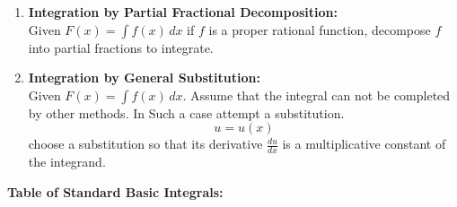 \documentclass[14pt]{article}
\begin{document}
\begin{enumerate}
\begin{center}
        \end{center}
        \item \textbf{Integration by Partial Fractional
        Decomposition:}\\
        Given $F(x)=\int f(x) \,dx$ if $f$ is a proper rational
        function, decompose $f$ into partial fractions to integrate.
        \item \textbf{Integration by General Substitution:}\\
        Given $F(x)=\int f(x) \, dx$. Assume that the integral can not
        be completed by other methods. In Such a case attempt a
        substitution. $$u=u(x)$$ choose a substitution so that its
        derivative $\frac{du}{dx}$ is a multiplicative constant of the
        integrand.
    \end{enumerate}
    \textbf{Table of Standard Basic Integrals:}
\end{document}
